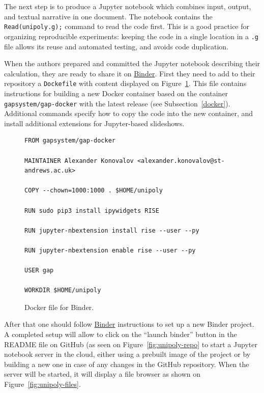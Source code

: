 The next step is to produce a Jupyter notebook which combines input,
output, and textual narrative in one document. The notebook contains
the {\tt Read(unipoly.g);} command to read the code first. This is
a good practice for organizing reproducible experiments: keeping the
code in a single location in a {\tt .g} file allows its reuse and
automated testing, and avoids code duplication. 

When the authors prepared and committed the Jupyter notebook describing
their calculation, they are ready to share it on
\href{https://mybinder.org/}{Binder}. First they need to add 
to their repository a {\tt Dockefile} with content displayed on Figure~\ref{fig:dockerfile}.
This file contains instructions for building 
a new Docker container based on the container {\tt gapsystem/gap-docker}
with the latest \GAP release
(see Subsection~\ref{docker}). Additional commands specify how to copy the code into
the new container, and install additional extensions for Jupyter-based slideshows.


\begin{figure}[!ht]
\begin{mdframed}
    \centering
    {\Small
\begin{verbatim}
FROM gapsystem/gap-docker

MAINTAINER Alexander Konovalov <alexander.konovalov@st-andrews.ac.uk>

COPY --chown=1000:1000 . $HOME/unipoly

RUN sudo pip3 install ipywidgets RISE

RUN jupyter-nbextension install rise --user --py

RUN jupyter-nbextension enable rise --user --py

USER gap

WORKDIR $HOME/unipoly
\end{verbatim}
    }
\end{mdframed}
    \caption{Docker file for Binder.}
    \label{fig:dockerfile}
\end{figure}

After that one should follow \href{https://mybinder.org/}{Binder} instructions to
set up a new Binder project. A completed setup will allow to click on the ``launch binder''
button in the README file on GitHub (as seen on Figure~\ref{fig:unipoly-repo}
to start a Jupyter notebook server in the cloud,
either using a prebuilt image of the project or by building a new one in case of any
changes in the GitHub repository. When the server will be started, it will display
a file browser as shown on Figure~\ref{fig:unipoly-files}.

